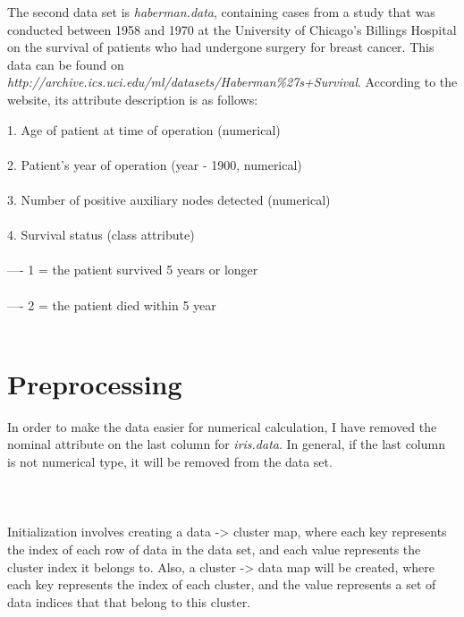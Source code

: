\documentclass[12pt]{article}
\begin{document}
The second data set is \textit{haberman.data}, containing cases from a study that was conducted between 1958 and 1970 at the University of Chicago's Billings Hospital on the survival of patients who had undergone surgery for breast cancer. This data can be found on \textit{http://archive.ics.uci.edu/ml/datasets/Haberman\%27s+Survival}. According to the website, its attribute description is as follows:
\begin{flushleft}
1. Age of patient at time of operation (numerical)\\\\
2. Patient's year of operation (year - 1900, numerical)\\\\
3. Number of positive auxiliary nodes detected (numerical)\\\\
4. Survival status (class attribute)\\\\
---- 1 = the patient survived 5 years or longer\\\\
---- 2 = the patient died within 5 year\\\\
\end{flushleft}

\section*{Preprocessing}
\begin{flushleft}
In order to make the data easier for numerical calculation, I have removed the nominal attribute on the last column for \textit{iris.data}. In general, if the last column is not numerical type, it will be removed from the data set.\\\\
\\\\
Initialization involves creating a data -> cluster map, where each key represents the index of each row of data in the data set, and each value represents the cluster index it belongs to. Also, a cluster -> data map will be created, where each key represents the index of each cluster, and the value represents a set of data indices that that belong to this cluster.
\end{flushleft}
\end{document}

